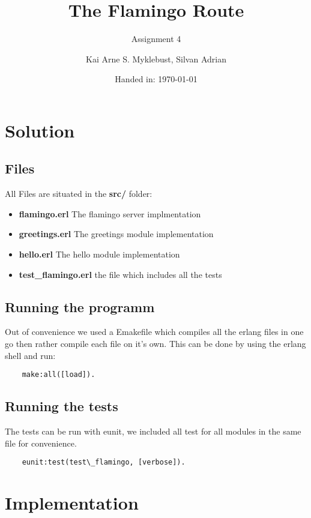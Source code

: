 \documentclass[12pt,a4paper]{article}
\begin{document}
\title{The Flamingo Route}
\subtitle{Assignment 4}

\author{Kai Arne S. Myklebust, Silvan Adrian}
\date{Handed in: \today}
	
\maketitle
\tableofcontents

\section{Solution}

\subsection{Files}
All Files are situated in the \textbf{src/} folder:
\begin{itemize}
	\item \textbf{flamingo.erl} The flamingo server implmentation
	\item \textbf{greetings.erl} The greetings module implementation
	\item \textbf{hello.erl} The hello module implementation
	\item \textbf{test\_flamingo.erl} the file which includes all the tests
\end{itemize}

\subsection{Running the programm}
Out of convenience we used a Emakefile which compiles all the erlang files in one go then rather compile each file on it's own.
This can be done by using the erlang shell and run:

\begin{verbatim}
	make:all([load]).
\end{verbatim}

\subsection{Running the tests}
The tests can be run with eunit, we included all test for all modules in the same file for convenience.

\begin{verbatim}
	eunit:test(test\_flamingo, [verbose]).
\end{verbatim}

\section{Implementation}
\end{document}
